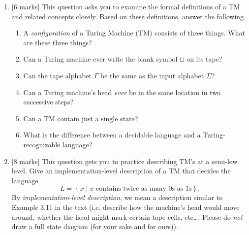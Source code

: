 \documentclass{article}
\newcommand{\set}[1]{{\left\{#1\right\}}}    %
\begin{document}
\begin{enumerate}
    \item {[6 marks]} This question asks you to examine the formal definitions of a TM and related concepts closely. Based on these definitions, answer the following.
        \begin{enumerate}
            \item A \emph{configuration} of a Turing Machine (TM) consists of three things. What are these three things?
            \item Can a Turing machine ever write the blank symbol $\sqcup$ on its tape?
            \item Can the tape alphabet $\Gamma$ be the same as the input alphabet $\Sigma$?
            \item Can a Turing machine's head \emph{ever} be in the same location in two successive steps?
            \item Can a TM contain just a single state?
            \item What is the difference between a decidable language and a Turing-recognizable language?
        \end{enumerate}
    \item {[8 marks]} This question gets you to practice describing TM's at a semi-low level. Give an implementation-level description of a TM that decides the language \[L=\set{x\mid x\text{ contains twice as many 0s as 1s}}.\] By \emph{implementation-level description}, we mean a description similar to Example 3.11 in the text (i.e. describe how the machine's head would move around, whether the head might mark certain tape cells, etc\ldots. Please do \emph{not} draw a full state diagram (for your sake and for ours)).


\end{enumerate}
\end{document}

